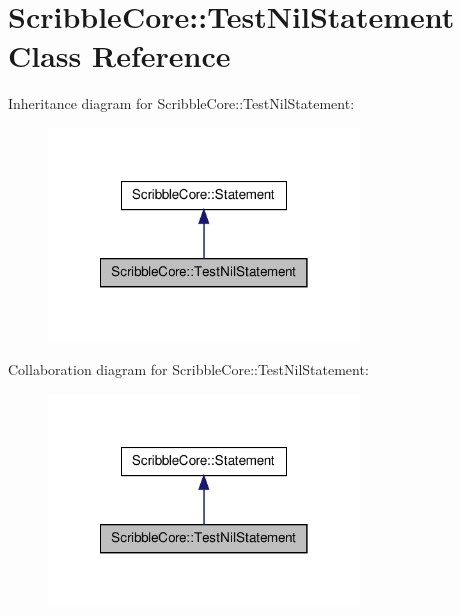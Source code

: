 \hypertarget{class_scribble_core_1_1_test_nil_statement}{\section{Scribble\-Core\-:\-:Test\-Nil\-Statement Class Reference}
\label{class_scribble_core_1_1_test_nil_statement}
}


Inheritance diagram for Scribble\-Core\-:\-:Test\-Nil\-Statement\-:\nopagebreak
\begin{figure}[H]
\begin{center}
\leavevmode
\includegraphics[width=234pt]{class_scribble_core_1_1_test_nil_statement__inherit__graph}
\end{center}
\end{figure}


Collaboration diagram for Scribble\-Core\-:\-:Test\-Nil\-Statement\-:\nopagebreak
\begin{figure}[H]
\begin{center}
\leavevmode
\includegraphics[width=234pt]{class_scribble_core_1_1_test_nil_statement__coll__graph}
\end{center}
\end{figure}
